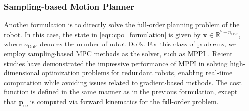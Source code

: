 \subsubsection{Sampling-based Motion Planner}

Another formulation is to directly solve the full-order planning problem of the robot. In this case, the state in \eqref{equ:cpo_formulation} is given by $\boldsymbol{x} \in \mathbb{R}^{7 + n_{\text{DoF}}}$, where $n_{\text{DoF}}$ denotes the number of robot DoFs. For this class of problems, we employ sampling-based MPC methods as the solver, such as MPPI \cite{williams2015model}. Recent studies have demonstrated the impressive performance of MPPI in solving high-dimensional optimization problems for redundant robots, enabling real-time computation while avoiding issues related to gradient-based methods. The cost function is defined in the same manner as in the previous formulation, except that $\boldsymbol{p}_{\text{ee}}$ is computed via forward kinematics for the full-order problem.
